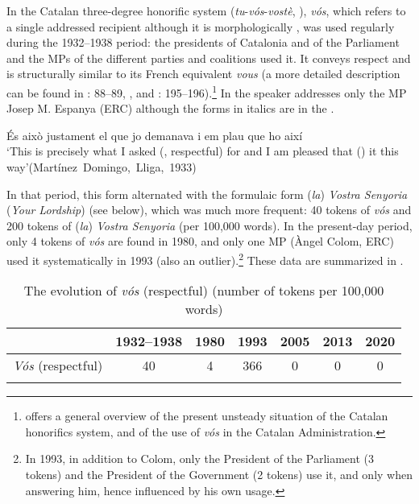 \documentclass[output=paper]{langscibook}
\begin{document}
In the Catalan three-degree honorific system (\textit{tu}{}-\textit{vós}{}-\textit{vostè}, ), \textit{vós}, which refers to a single addressed recipient although it is morphologically , was used regularly during the 1932–1938 period: the presidents of Catalonia and of the Parliament and the MPs of the different parties and coalitions used it. It conveys respect and is structurally similar to its French equivalent \textit{vous} (a more detailed description can be found in \citealt{Coromines1971}: 88--89, \cites[134--135]{Nogué2011}[232--233]{Nogué2015}, and \citealt{GIEC2016}: 195--196).\footnote{\citet{Nogué2022} offers a general overview of the present unsteady situation of the Catalan honorifics system, and \citet{Payà2022} of the use of \textit{vós} in the Catalan Administration.} In  the speaker addresses only the MP Josep M. Espanya (ERC) although the forms in italics are in the .


\ea\label{ex:nogue:20}
{{És això justament el que jo}  {demanava i em plau que ho}  {així}}\\

\glt `This is precisely what I asked  (,  respectful) for and I am pleased that  ()  it this way'\hfill\hbox{(Martínez Domingo, Lliga, 1933)}\\
\z 


In that period, this form alternated with the formulaic form (\textit{la}) \textit{Vostra Senyoria} (\textit{Your Lordship}) (see  below), which was much more frequent: 40 tokens of \textit{vós} and 200 tokens of (\textit{la}) \textit{Vostra Senyoria} (per 100,000 words). In the present-day period, only 4 tokens of \textit{vós} are found in 1980, and only one MP (Àngel Colom, ERC) used it systematically in 1993 (also an outlier).\footnote{In 1993, in addition to Colom, only the President of the Parliament (3 tokens) and the President of the Government (2 tokens) use it, and only when answering him, hence influenced by his own usage.} These data are summarized in .


\begin{table}
\begin{tabular}{ccccccc}
\lsptoprule
& {1932–1938} & {1980} & {1993} & {2005} & {2013} & {{2020}}\\
\midrule
{{\textit{Vós}} {(respectful)}} & {40} & {4} & {366} & {0} & {0} & {0}\\
\lspbottomrule
\end{tabular}
\caption{The evolution of \textit{vós} (respectful) (number of tokens per 100,000 words)}
\label{tab:nogue:8}
\end{table}
\end{document}
